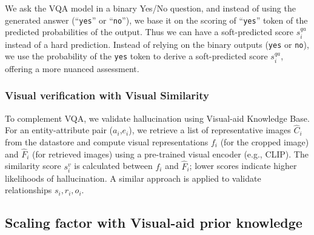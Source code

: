 We ask the VQA model in a binary Yes/No question, and instead of using the generated answer (``\texttt{yes}'' or ``\texttt{no}''), we base it on the scoring of ``\texttt{yes}'' token of the predicted probabilities of the output. Thus we can have a soft-predicted score $s^{qa}_i$ instead of a hard prediction.
Instead of relying on the binary outputs (\texttt{yes} or \texttt{no}), we use the probability of the \texttt{yes} token to derive a soft-predicted score $s^{qa}_i$, offering a more nuanced assessment.

\subsubsection{Visual verification with Visual Similarity}


To complement VQA, we validate hallucination using Visual-aid Knowledge Base. For an entity-attribute pair ($a_i$,$e_i$), we retrieve a list of representative images $\hat{C}_i$ from the datastore and compute visual representations $f_i$ (for the cropped image) and $\hat{F}_i$ (for retrieved images) using a pre-trained visual encoder (e.g., CLIP). The similarity score $s^{v}_i$ is calculated between $f_i$ and $\hat{F}_i$; lower scores indicate higher likelihoods of hallucination. A similar approach is applied to validate relationships $s_i,r_i,o_i$.

\subsection{Scaling factor with Visual-aid prior knowledge}


